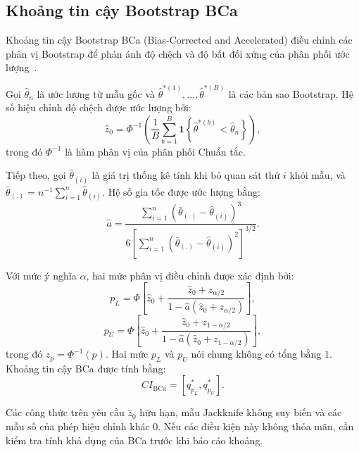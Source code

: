 \documentclass[12pt,a4paper]{article}
\theoremstyle{definition}
\numberwithin{equation}{section}
\begin{document}
\subsection{Khoảng tin cậy Bootstrap BCa}

Khoảng tin cậy Bootstrap BCa (Bias-Corrected and Accelerated) điều chỉnh
các phân vị Bootstrap để phản ánh độ chệch và độ bất đối xứng của phân phối
ước lượng~\cite{efron1993,davison1997}.

Gọi $\hat{\theta}_n$ là ước lượng từ mẫu gốc và
$\hat{\theta}^{*(1)},\ldots,\hat{\theta}^{*(B)}$ là các bản sao Bootstrap.
Hệ số hiệu chỉnh độ chệch được ước lượng bởi:
\begin{equation}
	\widehat{z}_0
	=
	\Phi^{-1}\left(
	\frac{1}{B}\sum_{b=1}^{B}
	\mathbf{1}\left\{
	\hat{\theta}^{*(b)} < \hat{\theta}_n
	\right\}
	\right),
\end{equation}
trong đó $\Phi^{-1}$ là hàm phân vị của phân phối Chuẩn tắc.

Tiếp theo, gọi $\hat{\theta}_{(i)}$ là giá trị thống kê tính khi bỏ quan sát
thứ $i$ khỏi mẫu, và
$\bar{\theta}_{(.)}=n^{-1}\sum_{i=1}^{n}\hat{\theta}_{(i)}$. Hệ số gia tốc
được ước lượng bằng:
\begin{equation}
	\widehat{a}
	=
	\frac{
		\displaystyle\sum_{i=1}^{n}
		\left(\bar{\theta}_{(.)}-\hat{\theta}_{(i)}\right)^3
	}{
		\displaystyle
		6\left[
		\sum_{i=1}^{n}
		\left(\bar{\theta}_{(.)}-\hat{\theta}_{(i)}\right)^2
		\right]^{3/2}
	}.
\end{equation}

Với mức ý nghĩa $\alpha$, hai mức phân vị điều chỉnh được xác định bởi:
\begin{equation}
	p_L
	=
	\Phi\left[
	\widehat{z}_0+
	\frac{\widehat{z}_0+z_{\alpha/2}}
	{1-\widehat{a}(\widehat{z}_0+z_{\alpha/2})}
	\right],
\end{equation}
\begin{equation}
	p_U
	=
	\Phi\left[
	\widehat{z}_0+
	\frac{\widehat{z}_0+z_{1-\alpha/2}}
	{1-\widehat{a}(\widehat{z}_0+z_{1-\alpha/2})}
	\right],
\end{equation}
trong đó $z_p=\Phi^{-1}(p)$. Hai mức $p_L$ và $p_U$ nói chung không có tổng bằng $1$. Khoảng tin cậy BCa được tính bằng:
\begin{equation}
	CI_{\mathrm{BCa}}
	=
	\left[
	q_{p_L}^{*},
	q_{p_U}^{*}
	\right].
\end{equation}

Các công thức trên yêu cầu $\widehat z_0$ hữu hạn, mẫu Jackknife không suy biến và các mẫu số của phép hiệu chỉnh khác $0$. Nếu các điều kiện này không thỏa mãn, cần kiểm tra tính khả dụng của BCa trước khi báo cáo khoảng.
\end{document}
